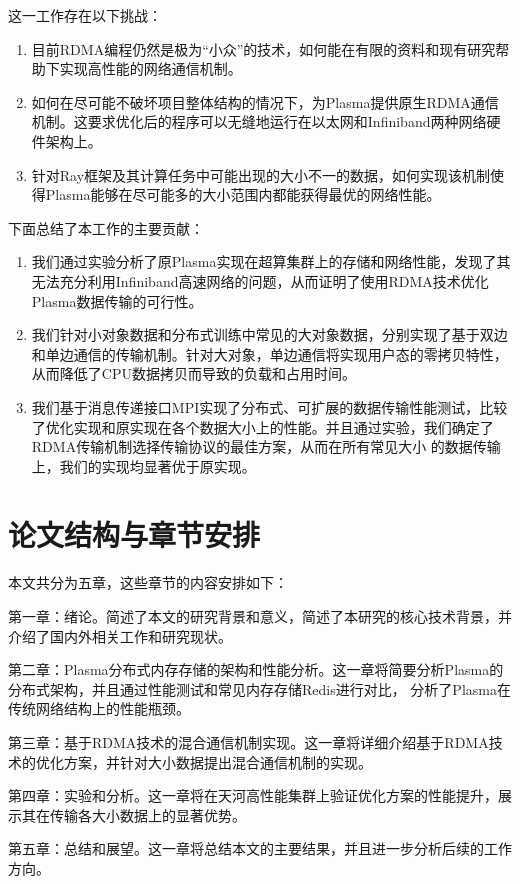 这一工作存在以下挑战：

\begin{enumerate}
	\item 目前RDMA编程仍然是极为“小众”的技术，如何能在有限的资料和现有研究帮助下实现高性能的网络通信机制。
	\item 如何在尽可能不破坏项目整体结构的情况下，为Plasma提供原生RDMA通信机制。这要求优化后的程序可以无缝地运行在以太网和Infiniband两种网络硬件架构上。
	\item 针对Ray框架及其计算任务中可能出现的大小不一的数据，如何实现该机制使得Plasma能够在尽可能多的大小范围内都能获得最优的网络性能。
\end{enumerate}

下面总结了本工作的主要贡献：

\begin{enumerate}
	\item 我们通过实验分析了原Plasma实现在超算集群上的存储和网络性能，发现了其无法充分利用Infiniband高速网络的问题，从而证明了使用RDMA技术优化Plasma数据传输的可行性。
	\item 我们针对小对象数据和分布式训练中常见的大对象数据，分别实现了基于双边和单边通信的传输机制。针对大对象，单边通信将实现用户态的零拷贝特性，从而降低了CPU数据拷贝而导致的负载和占用时间。
	\item 我们基于消息传递接口MPI实现了分布式、可扩展的数据传输性能测试，比较了优化实现和原实现在各个数据大小上的性能。并且通过实验，我们确定了RDMA传输机制选择传输协议的最佳方案，从而在所有常见大小
	的数据传输上，我们的实现均显著优于原实现。
\end{enumerate}

\section{论文结构与章节安排}
\label{sec:arrangement}

本文共分为五章，这些章节的内容安排如下：

第一章：绪论。简述了本文的研究背景和意义，简述了本研究的核心技术背景，并介绍了国内外相关工作和研究现状。

第二章：Plasma分布式内存存储的架构和性能分析。这一章将简要分析Plasma的分布式架构，并且通过性能测试和常见内存存储Redis进行对比，
分析了Plasma在传统网络结构上的性能瓶颈。

第三章：基于RDMA技术的混合通信机制实现。这一章将详细介绍基于RDMA技术的优化方案，并针对大小数据提出混合通信机制的实现。

第四章：实验和分析。这一章将在天河高性能集群上验证优化方案的性能提升，展示其在传输各大小数据上的显著优势。

第五章：总结和展望。这一章将总结本文的主要结果，并且进一步分析后续的工作方向。
